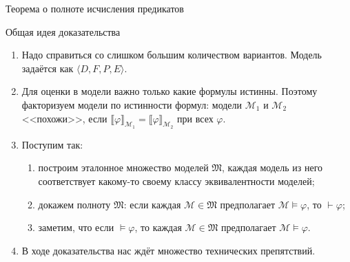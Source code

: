 \documentclass[aspectratio=169]{beamer}
\begin{document}
\begin{frame}


\begin{center}\LARGE Теорема о полноте исчисления предикатов\end{center}

\end{frame}

\begin{frame}{Общая идея доказательства}
\begin{enumerate}
\item Надо справиться со слишком большим количеством вариантов.
      Модель задаётся как $\langle D,F,P,E \rangle$.\pause
\item Для оценки в модели важно только какие формулы истинны. Поэтому факторизуем модели по истинности формул:
      модели $\mathcal{M}_1$ и $\mathcal{M}_2$ <<похожи>>, если
      $\llbracket \varphi \rrbracket_{\mathcal{M}_1} = \llbracket \varphi \rrbracket_{\mathcal{M}_2}$
      при всех $\varphi$.\pause
\item Поступим так:
    \begin{enumerate}
       \item построим эталонное множество моделей $\mathfrak{M}$, каждая модель из него соответствует какому-то своему классу эквивалентности моделей;\pause
       \item докажем полноту $\mathfrak{M}$: если каждая $\mathcal{M} \in \mathfrak{M}$ предполагает $\mathcal{M}\models\varphi$,
             то $\vdash\varphi$;\pause
       \item заметим, что если $\models\varphi$, то каждая $\mathcal{M} \in \mathfrak{M}$ предполагает $\mathcal{M}\models\varphi$.\pause
    \end{enumerate}
\item В ходе доказательства нас ждёт множество технических препятствий.
\end{enumerate}
\end{frame}
\end{document}
